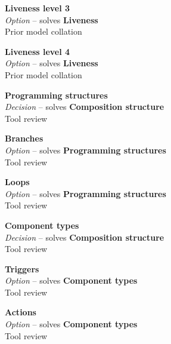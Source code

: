 
\textbf{Liveness level 3} \\ \emph{Option} -- solves \textbf{Liveness} \\ Prior model collation \cite{Aghaee2012}


\textbf{Liveness level 4} \\ \emph{Option} -- solves \textbf{Liveness} \\ Prior model collation \cite{Aghaee2012}


\textbf{Programming structures} \\ \emph{Decision} -- solves \textbf{Composition structure} \\ Tool review

\textbf{Branches} \\ \emph{Option} -- solves \textbf{Programming structures} \\ Tool review

\textbf{Loops} \\ \emph{Option} -- solves \textbf{Programming structures} \\ Tool review

\textbf{Component types} \\ \emph{Decision} -- solves \textbf{Composition structure} \\ Tool review

\textbf{Triggers} \\ \emph{Option} -- solves \textbf{Component types} \\ Tool review

\textbf{Actions} \\ \emph{Option} -- solves \textbf{Component types} \\ Tool review

